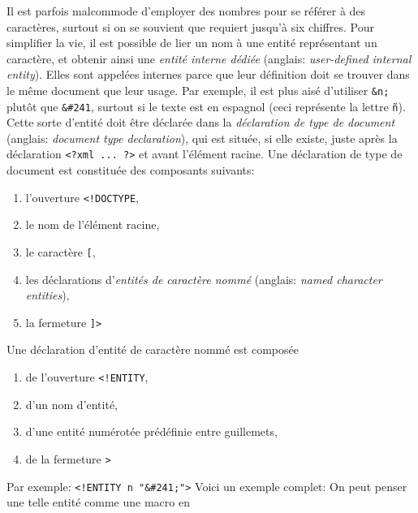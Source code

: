 Il est parfois malcommode d'employer des nombres pour se référer à des
caractères, surtout si on se souvient que \Unicode requiert jusqu'à
six chiffres. Pour simplifier la vie, il est possible de lier un nom à
une entité représentant un caractère, et obtenir ainsi une
\emph{entité interne dédiée} (anglais: \emph{user-defined internal
  entity}). Elles sont appelées internes parce que leur définition
doit se trouver dans le même document que leur usage. Par exemple, il
est plus aisé d'utiliser \verb|&n;| plutôt que \verb|&#241|, surtout
si le texte est en espagnol (ceci représente la lettre
\texttt{\~{n}}). Cette sorte d'entité doit être déclarée dans la
\emph{déclaration de type de document} (anglais: \emph{document type
  declaration}), qui est située, si elle existe, juste après la
déclaration \verb|<?xml ... ?>| et avant l'élément racine.
\label{xml_intro_DOCTYPE} Une déclaration de type de document est
constituée des composants suivants:
\begin{enumerate}

  \item l'ouverture \verb|<!DOCTYPE|,

  \item le nom de l'élément racine,

  \item le caractère \verb|[|,

  \item les déclarations d'\emph{entités de caractère nommé} (anglais:
    \emph{named character entities}),

  \item la fermeture \verb|]>|

\end{enumerate}
Une déclaration d'entité de caractère nommé est composée
\begin{enumerate}

  \item de l'ouverture \verb|<!ENTITY|,

  \item d'un nom d'entité,

  \item d'une entité numérotée prédéfinie entre guillemets,

  \item de la fermeture \verb|>|

\end{enumerate}
Par exemple: {\small\verb|<!ENTITY n "&#241;">|}
Voici un exemple complet:
\noindent On peut penser une telle entité comme une macro en
